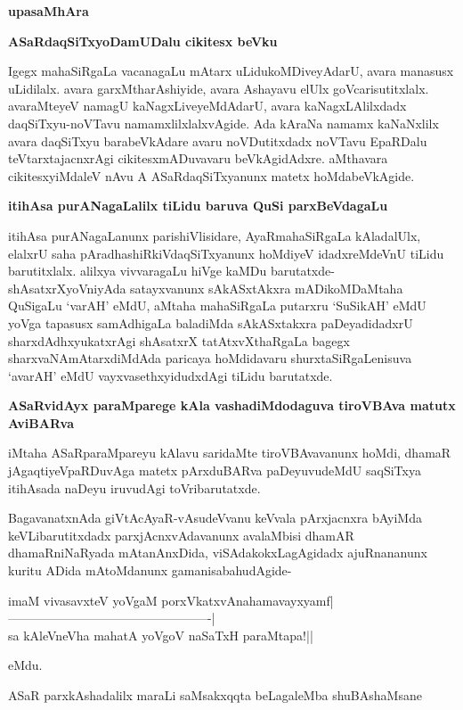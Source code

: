 \begin{center}
\textbf{upasaMhAra}
\end{center}

\textbf{ASaRdaqSiTxyoDamUDalu cikitesx beVku}

Igegx mahaSiRgaLa vacanagaLu mAtarx uLidukoMDiveyAdarU, avara manasusx uLidilalx. avara garxMtharAshiyide, avara Ashayavu elUlx goVcarisutitxlalx. avaraMteyeV namagU kaNagxLiveyeMdAdarU, avara kaNagxLAlilxdadx daqSiTxyu-noVTavu namamxlilxlalxvAgide. Ada kAraNa namamx kaNaNxlilx avara daqSiTxyu barabeVkAdare avaru noVDutitxdadx noVTavu EpaRDalu teVtarxtajacnxrAgi cikitesxmADuvavaru beVkAgidAdxre. aMthavara cikitesxyiMdaleV nAvu A ASaRdaqSiTxyanunx matetx hoMdabeVkAgide.

\textbf{itihAsa purANagaLalilx tiLidu baruva QuSi parxBeVdagaLu}

itihAsa purANagaLanunx parishiVlisidare, AyaRmahaSiRgaLa kAladalUlx, elalxrU saha pAradhashiRkiVdaqSiTxyanunx hoMdiyeV idadxreMdeVnU tiLidu barutitxlalx. alilxya vivvaragaLu hiVge kaMDu barutatxde- shAsatxrXyoVniyAda satayxvanunx sAkASxtAkxra mADikoMDaMtaha QuSigaLu `varAH' eMdU, aMtaha mahaSiRgaLa putarxru `SuSikAH' eMdU yoVga tapasusx samAdhigaLa baladiMda sAkASxtakxra paDeyadidadxrU sharxdAdhxyukatxrAgi shAsatxrX tatAtxvXthaRgaLa bagegx sharxvaNAmAtarxdiMdAda paricaya hoMdidavaru shurxtaSiRgaLenisuva `avarAH' eMdU vayxvasethxyidudxdAgi tiLidu barutatxde.

\textbf{ASaRvidAyx paraMparege kAla vashadiMdodaguva tiroVBAva matutx AviBARva}

iMtaha ASaRparaMpareyu kAlavu saridaMte tiroVBAvavanunx hoMdi, dhamaR jAgaqtiyeVpaRDuvAga matetx pArxduBARva paDeyuvudeMdU saqSiTxya itihAsada naDeyu iruvudAgi toVribarutatxde.

BagavanatxnAda giVtAcAyaR-vAsudeVvanu keVvala pArxjacnxra bAyiMda keVLibarutitxdadx parxjAcnxvAdavanunx avalaMbisi dhamAR dhamaRniNaRyada mAtanAnxDida, viSAdakokxLagAgidadx ajuRnananunx kuritu ADida mAtoMdanunx gamanisabahudAgide-

\begin{shloka}
imaM vivasavxteV yoVgaM porxVkatxvAnahamavayxyamf|\\
-------------------------------------------------|\\
sa kAleVneVha mahatA yoVgoV naSaTxH paraMtapa!|| 
\end{shloka}

eMdu.

ASaR parxkAshadalilx maraLi saMsakxqqta beLagaleMba shuBAshaMsane

